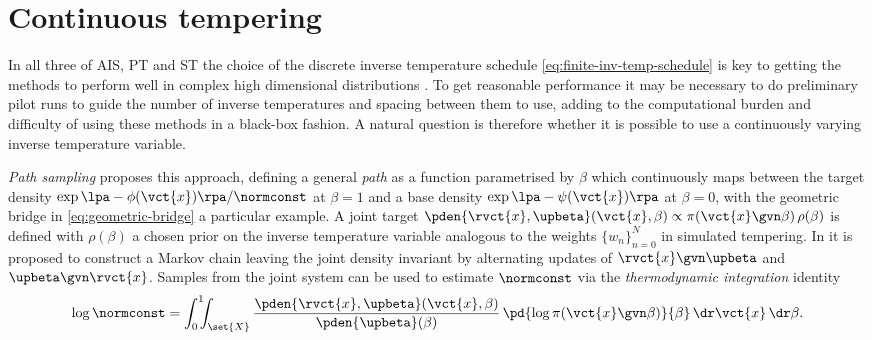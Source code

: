 \section{Continuous tempering}

In all three of \ac{AIS}, \ac{PT} and \ac{ST} the choice of the discrete inverse temperature schedule \eqref{eq:finite-inv-temp-schedule} is key to getting the methods to perform well in complex high dimensional distributions \citep{neal1996sampling,behrens2012tuning,betancourt2014adiabatic}. To get reasonable performance it may be necessary to do preliminary pilot runs to guide the number of inverse temperatures and spacing between them to use, adding to the computational burden and difficulty of using these methods in a black-box fashion. A natural question is therefore whether it is possible to use a continuously varying inverse temperature variable. %

\emph{Path sampling} \citep{gelman1998simulating} proposes this approach, defining a general \emph{path} as a function parametrised by $\beta$ which continuously maps between the target density $\exp\lpa-\phi(\vct{x})\rpa / \normconst$  at $\beta=1$ and a base density $\exp\lpa-\psi(\vct{x})\rpa$ at $\beta = 0$, with the geometric bridge in \eqref{eq:geometric-bridge} a particular example. A joint target $\pden{\rvct{x},\upbeta}(\vct{x},\beta) \propto \pi(\vct{x}\gvn\beta) \,\rho(\beta)$ is defined with $\rho(\beta)$ a chosen prior on the inverse temperature variable analogous to the weights $\lbrace w_n \rbrace_{n=0}^N$ in simulated tempering. In \citep{gelman1998simulating} it is proposed to construct a Markov chain leaving the joint density invariant by alternating updates of $\rvct{x}\gvn\upbeta$ and $\upbeta\gvn\rvct{x}$. Samples from the joint system can be used to estimate $\normconst$ via the \emph{thermodynamic integration} identity
\begin{equation}\label{thermodynamic-integration}
\log \normconst = 
\int_0^1 \hspace{-0.5em} \int_{\set{X}}
  \frac{\pden{\rvct{x},\upbeta}(\vct{x},\beta)}{\pden{\upbeta}(\beta)}\,
  \pd{\log\pi(\vct{x}\gvn\beta)}{\beta}
\,\dr\vct{x}\,\dr\beta.
\end{equation}

